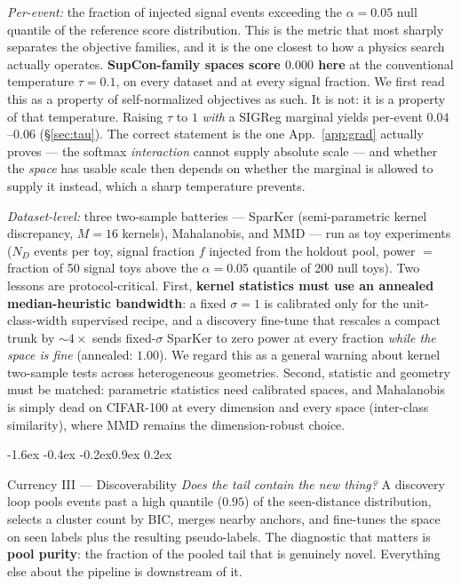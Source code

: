 \documentclass{article}
\makeatletter
\renewcommand\subsection{\@startsection{subsection}{2}{\z@}%
  {-1.6ex \@plus -0.4ex \@minus -0.2ex}{0.9ex \@plus 0.2ex}%
  {\normalsize\bf\raggedright}}
\makeatother
\begin{document}
\emph{Per-event:} the fraction of injected signal events exceeding the
$\alpha=0.05$ null quantile of the reference score distribution. This is the
metric that most sharply separates the objective families, and it is the one
closest to how a physics search actually operates. \textbf{SupCon-family spaces
score $0.000$ here} at the conventional temperature $\tau=0.1$, on every
dataset and at every signal fraction. We first read this as a property of
self-normalized objectives as such. It is not: it is a property of that
temperature. Raising $\tau$ to $1$ \emph{with} a SIGReg marginal yields
per-event $0.04$--$0.06$ (\S\ref{sec:tau}). The correct statement is the one
App.~\ref{app:grad} actually proves --- the softmax \emph{interaction} cannot
supply absolute scale --- and whether the \emph{space} has usable scale then
depends on whether the marginal is allowed to supply it instead, which a sharp
temperature prevents.

\emph{Dataset-level:} three two-sample batteries --- SparKer (semi-parametric
kernel discrepancy, $M{=}16$ kernels), Mahalanobis, and MMD --- run as toy
experiments ($N_D$ events per toy, signal fraction $f$ injected from the
holdout pool, power $=$ fraction of 50 signal toys above the $\alpha=0.05$
quantile of 200 null toys). Two lessons are protocol-critical. First,
\textbf{kernel statistics must use an annealed median-heuristic bandwidth}: a
fixed $\sigma{=}1$ is calibrated only for the unit-class-width supervised
recipe, and a discovery fine-tune that rescales a compact trunk by $\sim4\times$
sends fixed-$\sigma$ SparKer to zero power at every fraction \emph{while the
space is fine} (annealed: $1.00$). We regard this as a general warning about
kernel two-sample tests across heterogeneous geometries. Second, statistic and
geometry must be matched: parametric statistics need calibrated spaces, and
Mahalanobis is simply dead on CIFAR-100 at every dimension and every space
(inter-class similarity), where MMD remains the dimension-robust choice.

\subsection{Currency III --- Discoverability}
\emph{Does the tail contain the new thing?} A discovery loop pools events past
a high quantile ($0.95$) of the seen-distance distribution, selects a cluster
count by BIC, merges nearby anchors, and fine-tunes the space on seen labels
plus the resulting pseudo-labels. The diagnostic that matters is \textbf{pool
purity}: the fraction of the pooled tail that is genuinely novel. Everything
else about the pipeline is downstream of it.
\end{document}
